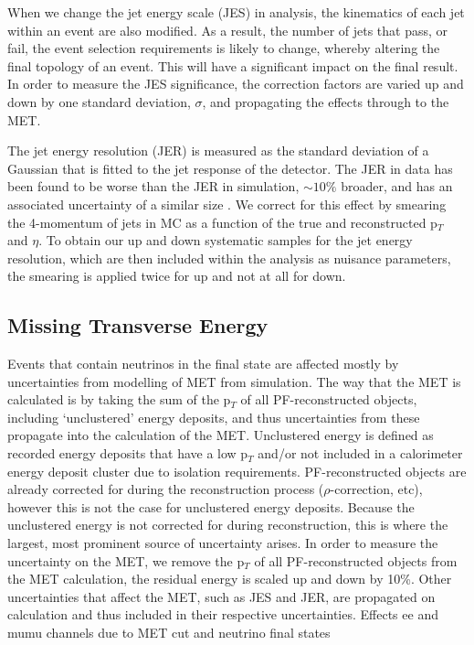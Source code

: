 When we change the jet energy scale (JES) in analysis, the kinematics of each jet within an event are also modified. As a result, the number of jets that pass, or fail, the event selection requirements is likely to change, whereby altering the final topology of an event. This will have a significant impact on the final result. In order to measure the JES significance, the correction factors are varied up and down by one standard deviation, $\sigma$, and propagating the effects through to the MET. %

The jet energy resolution (JER) is measured as the standard deviation of a Gaussian that is fitted to the jet response of the detector. The JER in data has been found to be worse than the JER in simulation, $\sim 10\%$ broader, and has an associated uncertainty of a similar size \cite{CMS:2011esa}. We correct for this effect by smearing the 4-momentum of jets in MC as a function of the true and reconstructed p$_T$ and $\eta$. To obtain our up and down systematic samples for the jet energy resolution, which are then included within the analysis as nuisance parameters, the smearing is applied twice for up and not at all for down. %


\subsection{Missing Transverse Energy} \label{subsec-METUncertainty}

Events that contain neutrinos in the final state are affected mostly by uncertainties from modelling of MET from simulation. The way that the MET is calculated is by taking the sum of the p$_T$ of all PF-reconstructed objects, including `unclustered' energy deposits, and thus uncertainties from these propagate into the calculation of the MET. Unclustered energy is defined as recorded energy deposits that have a low p$_T$ and/or not included in a calorimeter energy deposit cluster due to isolation requirements. PF-reconstructed objects are already corrected for during the reconstruction process ($\rho$-correction, etc), however this is not the case for unclustered energy deposits. Because the unclustered energy is not corrected for during reconstruction, this is where the largest, most prominent source of uncertainty arises. In order to measure the uncertainty on the MET, we remove the p$_T$ of all PF-reconstructed objects from the MET calculation, the residual energy is scaled up and down by 10\%. Other uncertainties that affect the MET, such as JES and JER, are propagated on calculation and thus included in their respective uncertainties. Effects ee and mumu channels due to MET cut and neutrino final states %

